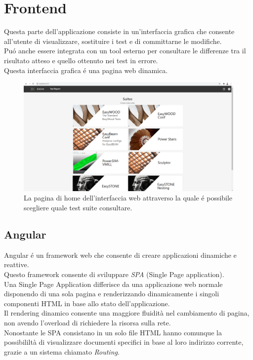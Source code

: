\chapter{Frontend}
    Questa parte dell'applicazione consiste in un'interfaccia grafica che consente all'utente di visualizzare, sostituire i test e di committarne le modifiche.\\
    Pu\'o anche essere integrata con un tool esterno per consultare le differenze tra il risultato atteso e quello ottenuto nei test in errore.\\
    Questa interfaccia grafica \'e una pagina web dinamica.\\
    \begin{figure}[h]
        \includegraphics[width=\textwidth]{images/homepage.png}
        \caption{La pagina di home dell'interfaccia web attraverso la quale \'e possibile scegliere quale test suite consultare.}
    \end{figure}
    \section{Angular}
        Angular \'e un framework web che consente di creare applicazioni dinamiche e reattive.    \\
        Questo framework consente di sviluppare \textit{SPA} (Single Page application).\\
        Una Single Page Application differisce da una applicazione web normale disponendo di una sola pagina e renderizzando dinamicamente i singoli componenti HTML in base allo stato dell'applicazione.\\
        Il rendering dinamico consente una maggiore fluidità nel cambiamento di pagina, non avendo l'overload di richiedere la risorsa sulla rete.\\
        Nonostante le SPA consistano in un solo file HTML hanno comunque la possibililtà di visualizzare documenti specifici in base al loro indirizzo corrente, grazie a un sistema chiamato \textit{Routing}. \\

